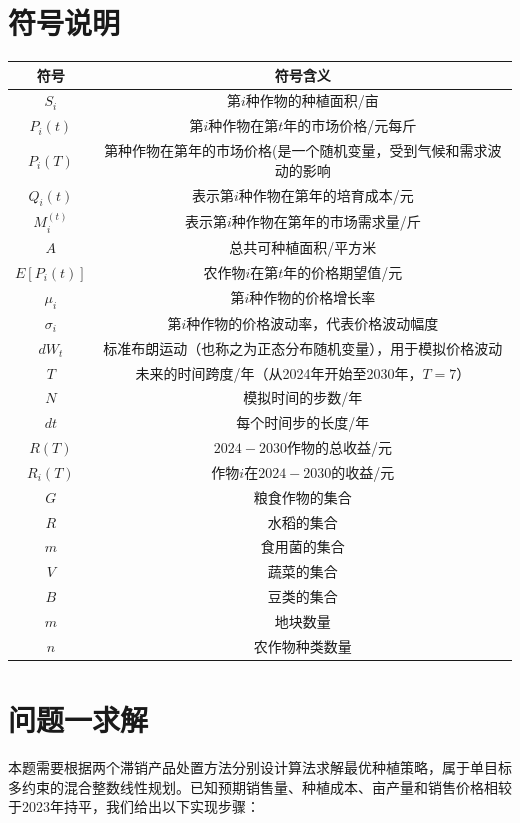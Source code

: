 \documentclass[12pt]{ctexart}
\begin{document}
	\section{符号说明}  
	\label{sec:notation}  
	\centering  
	\begin{tabular}{c c}  
		\toprule  
		符号 & 符号含义\\  
		\midrule  
		$S_{i}$ & 第$i$种作物的种植面积/亩\\  
		$P_{i}(t)$ & 第$i$种作物在第$t$年的市场价格/元每斤\\  
		$P_i(T)$ & 第种作物在第年的市场价格(是一个随机变量，受到气候和需求波动的影响\\
		$Q_i(t)$ & 表示第$i$种作物在第年的培育成本/元\\
		$M_i^{(t)}$ & 表示第$i$种作物在第年的市场需求量/斤\\
		$A$ & 总共可种植面积/平方米\\
		$E\left[P_i(t)\right]$ & 农作物$i$在第$t$年的价格期望值/元\\
		$\mu_i$ & 第$i$种作物的价格增长率\\
		$\sigma_i$ & 第$i$种作物的价格波动率，代表价格波动幅度\\
		$d W_t$ & 标准布朗运动（也称之为正态分布随机变量），用于模拟价格波动\\
		$T$ & 未来的时间跨度/年（从2024年开始至2030年，$T=7$）\\
		$N$ & 模拟时间的步数/年\\
		$d t$ & 每个时间步的长度/年\\
		$R(T)$ & $2024-2030$作物的总收益/元\\
		$R_i(T)$ & 作物$i$在$2024-2030$的收益/元\\
		$G$ & 粮食作物的集合\\
		$R$ & 水稻的集合\\
		$m$ & 食用菌的集合\\
		$V$ & 蔬菜的集合\\
		$B$ & 豆类的集合\\
		$m$ & 地块数量\\
		$n$ & 农作物种类数量\\
		\bottomrule  
	\end{tabular}  
	
	\raggedright
	
	\section{问题一求解}  
	\label{sec:solution1}  
	   本题需要根据两个滞销产品处置方法分别设计算法求解最优种植策略，属于单目标多约束的混合整数线性规划。已知预期销售量、种植成本、亩产量和销售价格相较于2023年持平，我们给出以下实现步骤：
	   
\end{document}

